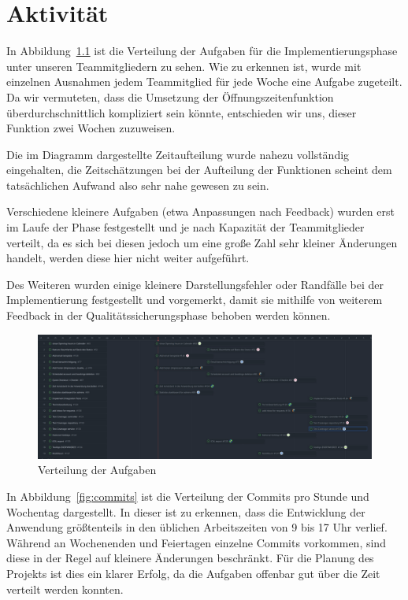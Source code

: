 
\chapter{Aktivität}
\label{chap:activity}

In Abbildung~\ref{fig:tasks} ist die Verteilung der Aufgaben für die Implementierungsphase unter unseren Teammitgliedern zu sehen.
Wie zu erkennen ist, wurde mit einzelnen Ausnahmen jedem Teammitglied für jede Woche eine Aufgabe zugeteilt.
Da wir vermuteten, dass die Umsetzung der Öffnungszeitenfunktion überdurchschnittlich kompliziert sein könnte,
entschieden wir uns, dieser Funktion zwei Wochen zuzuweisen.

Die im Diagramm dargestellte Zeitaufteilung wurde nahezu vollständig eingehalten,
die Zeitschätzungen bei der Aufteilung der Funktionen scheint dem tatsächlichen Aufwand also sehr nahe gewesen zu sein.

Verschiedene kleinere Aufgaben (etwa Anpassungen nach Feedback) wurden erst im Laufe der Phase festgestellt und je nach Kapazität der Teammitglieder verteilt,
da es sich bei diesen jedoch um eine große Zahl sehr kleiner Änderungen handelt, werden diese hier nicht weiter aufgeführt.

Des Weiteren wurden einige kleinere Darstellungsfehler oder Randfälle bei der Implementierung festgestellt und vorgemerkt,
damit sie mithilfe von weiterem Feedback in der Qualitätssicherungsphase behoben werden können.

\begin{figure}[ht]
    \centering
    \includegraphics[width=\textwidth]{figures/tasks}
    \caption{Verteilung der Aufgaben}
    \label{fig:tasks}
\end{figure}

In Abbildung~\ref{fig:commits} ist die Verteilung der Commits pro Stunde und Wochentag dargestellt.
In dieser ist zu erkennen, dass die Entwicklung der Anwendung größtenteils in den üblichen Arbeitszeiten von 9 bis 17 Uhr verlief.
Während an Wochenenden und Feiertagen einzelne Commits vorkommen, sind diese in der Regel auf kleinere Änderungen beschränkt.
Für die Planung des Projekts ist dies ein klarer Erfolg, da die Aufgaben offenbar gut über die Zeit verteilt werden konnten.

